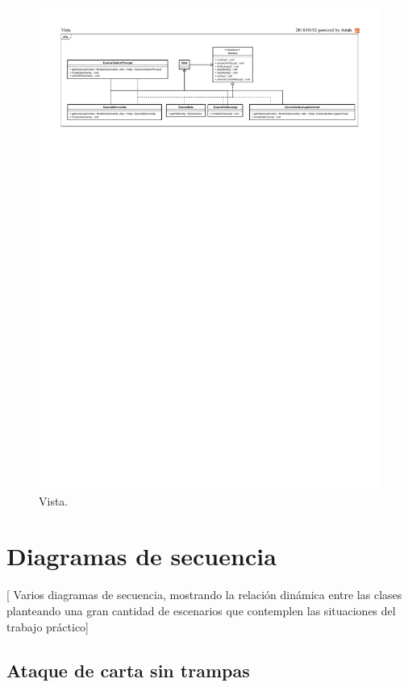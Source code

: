 \begin{figure}[H]
	\centering
	\includegraphics[scale=0.8]{includes/class_Vista}
	\caption{Vista.}
	\label{class_Vista}
\end{figure}


\clearpage
\section{Diagramas de secuencia}

[ Varios diagramas de secuencia, mostrando la relación dinámica entre las
clases planteando una gran cantidad de escenarios que contemplen las
situaciones del trabajo práctico]

\subsection{Ataque de carta sin trampas}


